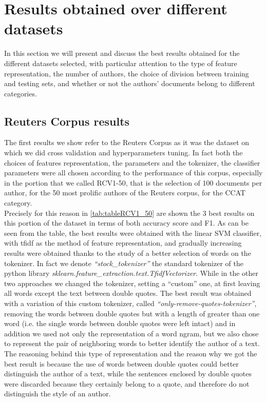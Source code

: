 \section{Results obtained over different datasets}

In this section we will present and discuss the best results obtained for the different datasets selected, with particular attention to the type of feature representation, the number of authors, the choice of division between training and testing sets, and whether or not the authors' documents belong to different categories.

\subsection{Reuters Corpus results}

The first results we show refer to the Reuters Corpus as it was the dataset on which we did cross validation and hyperparameters tuning. In fact both the choices of features representation, the parameters and the tokenizer, the classifier parameters were all chosen according to the performance of this corpus, especially in the portion that we called RCV1-50, that is the selection of 100 documents per author, for the 50 most prolific authors of the Reuters corpus, for the CCAT category.\\
Precisely for this reason in \autoref{tab:tableRCV1_50} are shown the 3 best results on this portion of the dataset in terms of both accuracy score and F1. As can be seen from the table, the best results were obtained with the linear SVM classifier, with tfidf as the method of feature representation, and gradually increasing results were obtained thanks to the study of a better selection of words on the tokenizer.
In fact we denote \textit{\enquote{stock\_tokenizer}} the standard tokenizer of the python library 
\textit{sklearn.feature\_extraction.text.TfidfVectorizer}. While in the other two approaches we changed the tokenizer, setting a \enquote{custom} one, at first leaving all words except the text between double quotes. The best result was obtained with a variation of this custom tokenizer, called \textit{\enquote{only-remove-quotes-tokenizer}}, removing the words between double quotes but with a length of greater than one word (i.e. the single words between double quotes were left intact) and in addition we used not only the representation of a word ngram, but we also chose to represent the pair of neighboring words to better identify the author of a text.
The reasoning behind this type of representation and the reason why we got the best result is because the use of words between double quotes could better distinguish the author of a text, while the sentences enclosed by double quotes were discarded because they certainly belong to a quote, and therefore do not distinguish the style of an author.


